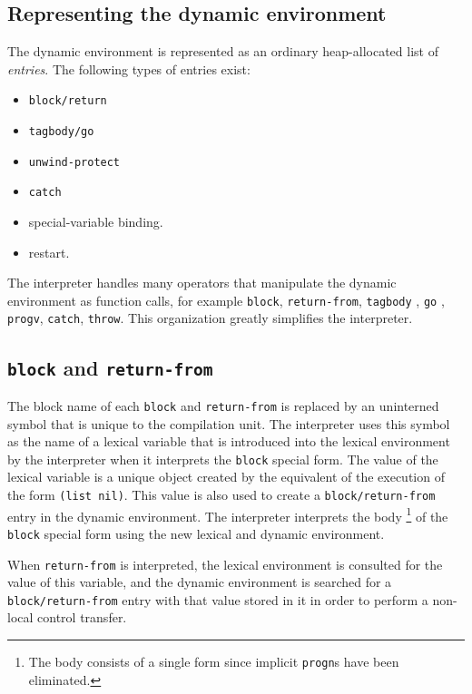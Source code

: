 \subsection{Representing the dynamic environment}

The dynamic environment is represented as an ordinary heap-allocated
\commonlisp{} list of \emph{entries}.  The following types of entries
exist:

\begin{itemize}
\item \texttt{block/return}
\item \texttt{tagbody/go}
\item \texttt{unwind-protect}
\item \texttt{catch}
\item special-variable binding.
\item restart.
\end{itemize}

The interpreter handles many operators that manipulate the dynamic
environment as function calls, for example \texttt{block},
\texttt{return-from}, \texttt{tagbody} , \texttt{go} , \texttt{progv},
\texttt{catch}, \texttt{throw}.  This organization greatly simplifies
the interpreter.

\subsection{\texttt{block} and \texttt{return-from}}

The block name of each \texttt{block} and \texttt{return-from} is
replaced by an uninterned symbol that is unique to the compilation
unit.  The interpreter uses this symbol as the name of a lexical
variable that is introduced into the lexical environment by the
interpreter when it interprets the \texttt{block} special form.  The
value of the lexical variable is a unique object created by the
equivalent of the execution of the form \texttt{(list nil)}.  This
value is also used to create a \texttt{block/return-from} entry in the
dynamic environment.  The interpreter interprets the body%
\footnote{The body consists of a single form since implicit
  \texttt{progn}s have been eliminated.}
of the \texttt{block} special form using the new lexical and dynamic
environment.

When
\texttt{return-from} is interpreted, the lexical environment is
consulted for the value of this variable, and the dynamic environment
is searched for a \texttt{block/return-from} entry with that value
stored in it in order to perform a non-local control transfer.

